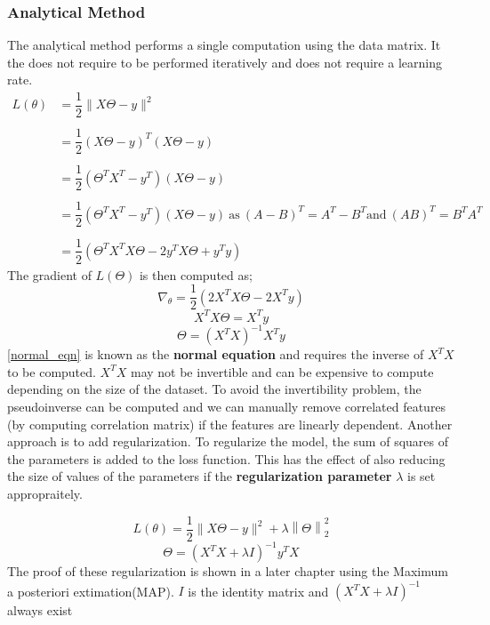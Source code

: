 \documentclass[12pt,a4paper,titlepage,landscape]{book}
\begin{document}
	\subsubsection{Analytical Method}
	The analytical method performs a single computation using the data matrix. It the does not require to be performed iteratively and does not require a learning rate.
	\begin{equation*}
		\begin{array}{cl}
		L(\theta) &= \dfrac{1}{2}\|X\Theta - y\|^2 \\\\
		&= \dfrac{1}{2}(X\Theta - y)^T(X\Theta - y) \\\\
		&= \dfrac{1}{2}(\Theta^{T}X^T - y^T)(X\Theta - y) \\\\
		&= \dfrac{1}{2}(\Theta^{T}X^T - y^T)(X\Theta - y) ~ \text{as} ~ (A - B)^T = A^T - B^T \text{and} ~ (AB)^T = B^TA^T \\\\
		&= \dfrac{1}{2}(\Theta^{T}X^TX\Theta - 2y^TX\Theta + y^Ty)
		\end{array}
	\end{equation*}
	The gradient of $L(\Theta)$ is then computed as;
	\begin{equation*}
		\nabla_\theta = \dfrac{1}{2}\left(2X^TX\Theta - 2X^Ty\right)
	\end{equation*}
	\begin{equation*}
	X^TX\Theta = X^Ty
	\end{equation*}
	\begin{equation}\label{normal_eqn}
	\Theta = \left(X^TX\right)^{-1}X^Ty
	\end{equation}
	\eqref{normal_eqn} is known as the \textbf{normal equation} and requires the inverse of $X^TX$ to be computed. $X^TX$ may not be invertible and can be expensive to compute depending on the size of the dataset. To avoid the invertibility problem, the pseudoinverse can be computed and we can manually remove correlated features (by computing correlation matrix) if the features are linearly dependent. Another approach is to add regularization. To regularize the model, the sum of squares of the parameters is added to the loss function. This has the effect of also reducing the size of values of the parameters if the \textbf{regularization parameter} $\lambda$ is set appropraitely.
	
	
	\begin{equation}
	L(\theta) = \dfrac{1}{2}\|X\Theta - y\|^2 + \lambda\left\|\Theta\right\|_2^2
	\end{equation}
	\begin{equation}
		\Theta = \left(X^TX + \lambda{I}\right)^{-1}y^TX
	\end{equation}
	The proof of these regularization is shown in a later chapter using the Maximum a posteriori extimation(MAP). $I$ is the identity matrix and $\left(X^TX + \lambda{I}\right)^{-1}$ always exist
	
\end{document}
